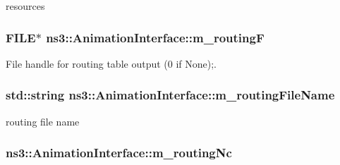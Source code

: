 resources 

\subsubsection[{\texorpdfstring{m\+\_\+routingF}{m_routingF}}]{\setlength{\rightskip}{0pt plus 5cm}F\+I\+LE$\ast$ ns3\+::\+Animation\+Interface\+::m\+\_\+routingF\hspace{0.3cm}{\ttfamily [private]}}\hypertarget{classns3_1_1AnimationInterface_a51b17d826fa98c9854746dea46fa87f7}{}\label{classns3_1_1AnimationInterface_a51b17d826fa98c9854746dea46fa87f7}


File handle for routing table output (0 if None);. 

\subsubsection[{\texorpdfstring{m\+\_\+routing\+File\+Name}{m_routingFileName}}]{\setlength{\rightskip}{0pt plus 5cm}std\+::string ns3\+::\+Animation\+Interface\+::m\+\_\+routing\+File\+Name\hspace{0.3cm}{\ttfamily [private]}}\hypertarget{classns3_1_1AnimationInterface_a206e3704698a949eed175f9c6df414fe}{}\label{classns3_1_1AnimationInterface_a206e3704698a949eed175f9c6df414fe}


routing file name 

\subsubsection[{\texorpdfstring{m\+\_\+routing\+Nc}{m_routingNc}}]{ ns3\+::\+Animation\+Interface\+::m\+\_\+routing\+Nc\hspace{0.3cm}{\ttfamily [private]}}\hypertarget{classns3_1_1AnimationInterface_af739aca09318747e578cf97d59efe154}{}\label{classns3_1_1AnimationInterface_af739aca09318747e578cf97d59efe154}


